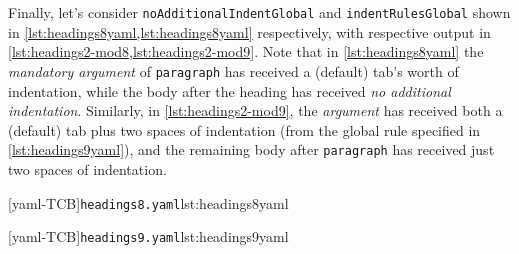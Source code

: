     Finally, let's consider \texttt{noAdditionalIndentGlobal} and \texttt{indentRulesGlobal} shown in \cref{lst:headings8yaml,lst:headings8yaml}
    respectively, with respective output in \cref{lst:headings2-mod8,lst:headings2-mod9}. Note that in \cref{lst:headings8yaml} the 
    \emph{mandatory argument} of \texttt{paragraph} has received a (default) tab's worth of indentation, while the body after the 
    heading has received \emph{no additional indentation}. Similarly, in \cref{lst:headings2-mod9}, the \emph{argument} has received both a
     (default) tab plus two spaces of indentation (from the global rule specified in \cref{lst:headings9yaml}), and the remaining body 
     after \texttt{paragraph} has received just two spaces of indentation.

	\begin{minipage}{.45\textwidth}
	\end{minipage}%
	\hfill
	\begin{minipage}{.45\textwidth}
		[yaml-TCB]{\texttt{headings8.yaml}}{lst:headings8yaml}
	\end{minipage}

	\begin{minipage}{.45\textwidth}
	\end{minipage}%
	\hfill
	\begin{minipage}{.45\textwidth}
		[yaml-TCB]{\texttt{headings9.yaml}}{lst:headings9yaml}
	\end{minipage}
